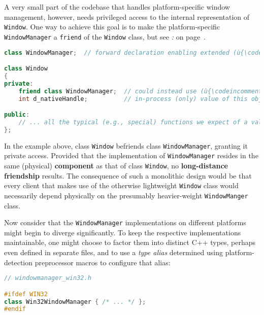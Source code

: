 A very small part of the codebase that handles platform-specific window
management, however, needs privileged access to the internal
representation of \texttt{Window}. One way to achieve this goal is to
make the platform-specific \texttt{WindowManager} a \texttt{friend} of
the \texttt{Window} class, but see \textit{: } on page~\pageref{long-distance-friendship}.

\begin{lstlisting}[language=C++]
class WindowManager;  // forward declaration enabling extended (ù{\codeincomments{friend}}ù) syntax

class Window
{
private:
    friend class WindowManager;  // could instead use (ù{\codeincomments{friend WindowManager;}}ù)
    int d_nativeHandle;          // in-process (only) value of this object

public:
    // ... all the typical (e.g., special) functions we expect of a value type
};
\end{lstlisting}

\noindent In the example above, class \texttt{Window} befriends class
\texttt{WindowManager}, granting it private access. Provided that the
implementation of \texttt{WindowManager} resides in the same (physical)
\textbf{component} as that of class \texttt{Window}, no
\textbf{long-distance friendship} results. The consequence of such a
monolithic design would be that every client that makes use of the
otherwise lightweight \texttt{Window} class would necessarily depend
physically on the presumably heavier-weight \texttt{WindowManger} class.

Now consider that the \texttt{WindowManager} implementations on
different platforms might begin to diverge significantly. To keep the
respective implementations maintainable, one might choose to factor them
into distinct C++ types, perhaps even defined in separate files, and to
use a \emph{type alias} determined using platform-detection preprocessor
macros to configure that alias:


\begin{lstlisting}[language=C++]
// windowmanager_win32.h

#ifdef WIN32
class Win32WindowManager { /* ... */ };
#endif
\end{lstlisting}

\vspace*{2ex}

